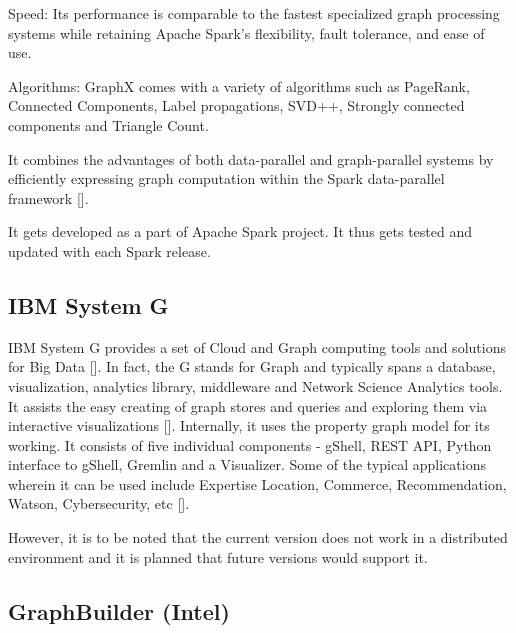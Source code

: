     Speed: Its performance is comparable to the fastest specialized
    graph processing systems while retaining Apache Spark's
    flexibility, fault tolerance, and ease of use.
    
    Algorithms: GraphX comes with a variety of algorithms such as
    PageRank, Connected Components, Label propagations, SVD++,
    Strongly connected components and Triangle Count.

    It combines the advantages of both data-parallel and
    graph-parallel systems by efficiently expressing graph computation
    within the Spark data-parallel framework [\cite{www-graphX1}].

    It gets developed as a part of Apache Spark project. It thus gets
    tested and updated with each Spark release.
    
\subsection{IBM System G}

IBM System G provides a set of Cloud and Graph computing tools and
solutions for Big Data [\cite{IBMSystemGDocumentation-1}].  In fact, the
G stands for Graph and typically spans a database, visualization,
analytics library, middleware and Network Science Analytics tools.  It
assists the easy creating of graph stores and queries and exploring
them via interactive visualizations [\cite{IBMSystemGDocumentation-2}].
Internally, it uses the property graph model for its working.  It
consists of five individual components - gShell, REST API, Python
interface to gShell, Gremlin and a Visualizer.  Some of the typical
applications wherein it can be used include Expertise Location,
Commerce, Recommendation, Watson, Cybersecurity,
etc [\cite{IBMSystemGPaper}].

    However, it is to be noted that the current version does not work
    in a distributed environment and it is planned that future
    versions would support it.
    
\subsection{GraphBuilder (Intel)}


